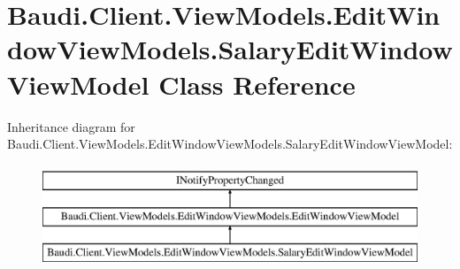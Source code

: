 \hypertarget{class_baudi_1_1_client_1_1_view_models_1_1_edit_window_view_models_1_1_salary_edit_window_view_model}{}\section{Baudi.\+Client.\+View\+Models.\+Edit\+Window\+View\+Models.\+Salary\+Edit\+Window\+View\+Model Class Reference}
\label{class_baudi_1_1_client_1_1_view_models_1_1_edit_window_view_models_1_1_salary_edit_window_view_model}
Inheritance diagram for Baudi.\+Client.\+View\+Models.\+Edit\+Window\+View\+Models.\+Salary\+Edit\+Window\+View\+Model\+:\begin{figure}[H]
\begin{center}
\leavevmode
\includegraphics[height=3.000000cm]{class_baudi_1_1_client_1_1_view_models_1_1_edit_window_view_models_1_1_salary_edit_window_view_model}
\end{center}
\end{figure}
